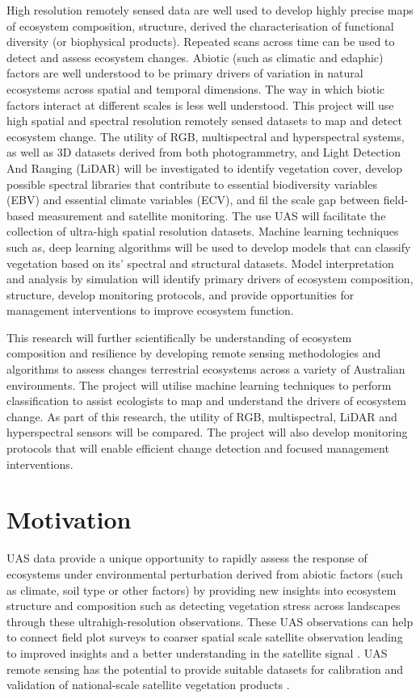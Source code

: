 High resolution remotely sensed data are well used to develop highly precise maps of ecosystem composition, structure, derived the characterisation of functional diversity (or biophysical products). Repeated scans across time can be used to detect and assess ecosystem changes. Abiotic (such as climatic and edaphic) factors are well understood to be primary drivers of variation in natural ecosystems across spatial and temporal dimensions. The way in which biotic factors interact at different scales is less well understood. This project will use high spatial and spectral resolution remotely sensed datasets to map and detect 
ecosystem change. The utility of RGB, multispectral and hyperspectral systems, as well as 3D datasets derived from both photogrammetry, and Light Detection And Ranging (LiDAR) will be investigated to identify 
vegetation cover, develop possible spectral libraries that contribute to essential biodiversity variables (EBV) and essential climate variables (ECV), and fil the scale gap between field-based measurement and satellite monitoring. The use UAS will facilitate the collection of ultra-high spatial resolution datasets. Machine learning techniques such as, deep learning algorithms will be used to develop models that can classify vegetation based on its’ spectral and structural datasets. Model interpretation and analysis by simulation will identify primary drivers of ecosystem composition, structure, develop monitoring protocols, and provide opportunities for management interventions to improve ecosystem function.

This research will further scientifically be understanding of ecosystem composition and resilience by developing remote sensing methodologies and algorithms to assess changes terrestrial ecosystems across a variety of Australian environments. The project will utilise machine learning techniques to perform classification to assist ecologists to map and understand the drivers of ecosystem change. As part of this research, the utility of RGB, multispectral, LiDAR and hyperspectral sensors will be compared. The project will also develop monitoring protocols that will enable efficient change detection and focused management interventions.


\section{Motivation}
UAS data provide a unique opportunity to rapidly assess the response of ecosystems under 
environmental perturbation derived from abiotic factors (such as climate, soil type or other factors) by providing new insights into ecosystem structure and composition such as detecting vegetation stress across landscapes through these ultrahigh-resolution observations. These UAS observations can help to connect field plot surveys to coarser spatial scale satellite observation leading to improved insights and a better understanding in the satellite signal \citep{lucieer2014Using, melvilleUltrahighSpatialResolution2019}. UAS remote sensing has the potential to provide suitable datasets for calibration and validation of national-scale satellite vegetation products \citep{fiskComparisonHyperspectralTraditional2019}.

